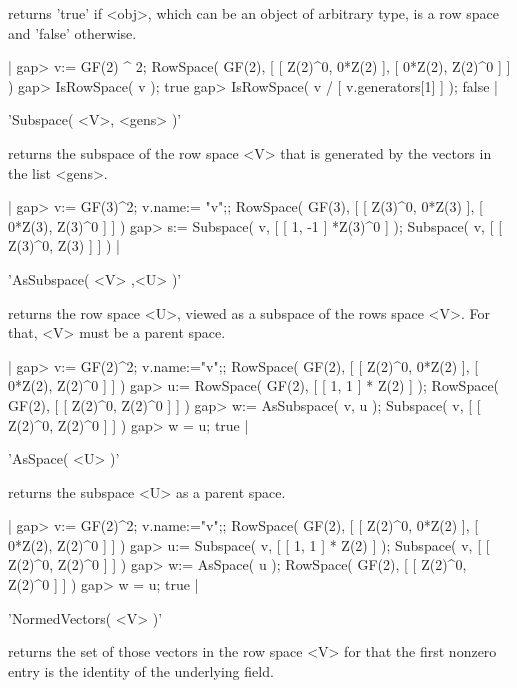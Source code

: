 returns 'true' if <obj>, which can be an object of arbitrary
type, is a row space and 'false' otherwise.

|    gap> v:= GF(2) ^ 2;
    RowSpace( GF(2), [ [ Z(2)^0, 0*Z(2) ], [ 0*Z(2), Z(2)^0 ] ] )
    gap> IsRowSpace( v );
    true
    gap> IsRowSpace( v / [ v.generators[1] ] );
    false |


'Subspace( <V>, <gens> )'

returns the subspace of the row space <V> that is generated by the vectors
in the list <gens>.

|    gap> v:= GF(3)^2; v.name:= "v";;
    RowSpace( GF(3), [ [ Z(3)^0, 0*Z(3) ], [ 0*Z(3), Z(3)^0 ] ] )
    gap> s:= Subspace( v, [ [ 1, -1 ] *Z(3)^0 ] );
    Subspace( v, [ [ Z(3)^0, Z(3) ] ] ) |


'AsSubspace( <V> ,<U> )'

returns the row space <U>, viewed as a subspace of the rows space <V>.
For that, <V> must be a parent space.

|    gap> v:= GF(2)^2; v.name:="v";;
    RowSpace( GF(2), [ [ Z(2)^0, 0*Z(2) ], [ 0*Z(2), Z(2)^0 ] ] )
    gap> u:= RowSpace( GF(2), [ [ 1, 1 ] * Z(2) ] );
    RowSpace( GF(2), [ [ Z(2)^0, Z(2)^0 ] ] )
    gap> w:= AsSubspace( v, u );
    Subspace( v, [ [ Z(2)^0, Z(2)^0 ] ] )
    gap> w = u;
    true |


'AsSpace( <U> )'

returns the subspace <U> as a parent space.

|    gap> v:= GF(2)^2; v.name:="v";;
    RowSpace( GF(2), [ [ Z(2)^0, 0*Z(2) ], [ 0*Z(2), Z(2)^0 ] ] )
    gap> u:= Subspace( v, [ [ 1, 1 ] * Z(2) ] );
    Subspace( v, [ [ Z(2)^0, Z(2)^0 ] ] )
    gap> w:= AsSpace( u );
    RowSpace( GF(2), [ [ Z(2)^0, Z(2)^0 ] ] )
    gap> w = u;
    true |


'NormedVectors( <V> )'

returns the set of those vectors in the row space <V> for that the first
nonzero entry is the identity of the underlying field.

